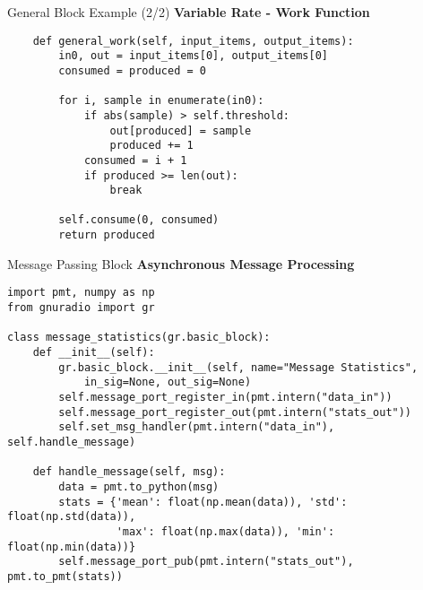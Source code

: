 \documentclass[aspectratio=169,11pt]{beamer}
\begin{document}
\begin{frame}[fragile]{General Block Example (2/2)}
\textbf{Variable Rate - Work Function}
\tiny
\begin{verbatim}
    def general_work(self, input_items, output_items):
        in0, out = input_items[0], output_items[0]
        consumed = produced = 0
        
        for i, sample in enumerate(in0):
            if abs(sample) > self.threshold:
                out[produced] = sample
                produced += 1
            consumed = i + 1
            if produced >= len(out): 
                break
                
        self.consume(0, consumed)
        return produced
\end{verbatim}
\end{frame}

\begin{frame}[fragile]{Message Passing Block}
\textbf{Asynchronous Message Processing}
\tiny
\begin{verbatim}
import pmt, numpy as np
from gnuradio import gr

class message_statistics(gr.basic_block):
    def __init__(self):
        gr.basic_block.__init__(self, name="Message Statistics",
            in_sig=None, out_sig=None)
        self.message_port_register_in(pmt.intern("data_in"))
        self.message_port_register_out(pmt.intern("stats_out"))
        self.set_msg_handler(pmt.intern("data_in"), self.handle_message)
    
    def handle_message(self, msg):
        data = pmt.to_python(msg)
        stats = {'mean': float(np.mean(data)), 'std': float(np.std(data)),
                 'max': float(np.max(data)), 'min': float(np.min(data))}
        self.message_port_pub(pmt.intern("stats_out"), pmt.to_pmt(stats))
\end{verbatim}
\end{frame}
\end{document}
